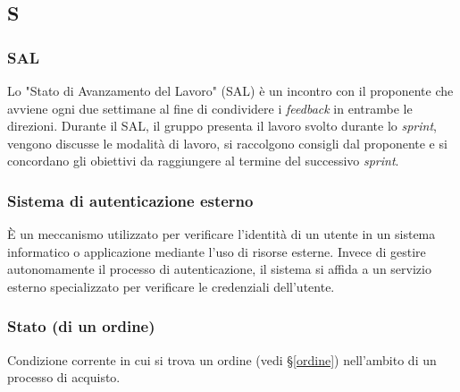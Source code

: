 \subsection{S}

\subsubsection{SAL}
Lo "Stato di Avanzamento del Lavoro" (SAL) è un incontro con il proponente che avviene ogni due settimane al fine di condividere i \textit{feedback} in entrambe le direzioni. 
Durante il SAL, il gruppo presenta il lavoro svolto durante lo \textit{sprint}, vengono discusse le modalità di lavoro, si raccolgono consigli dal proponente e si concordano gli obiettivi da raggiungere al termine del successivo \textit{sprint}.

\subsubsection{Sistema di autenticazione esterno}
È un meccanismo utilizzato per verificare l'identità di un utente in un sistema informatico o applicazione mediante l'uso di risorse esterne. 
Invece di gestire autonomamente il processo di autenticazione, il sistema si affida a un servizio esterno specializzato per verificare le credenziali dell'utente.

\subsubsection{Stato (di un ordine)}
Condizione corrente in cui si trova un ordine (vedi \S\ref{ordine}) nell'ambito
di un processo di acquisto.

\newpage
